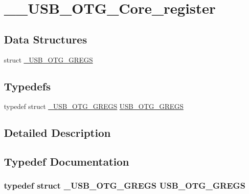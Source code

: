\hypertarget{group_______u_s_b___o_t_g___core__register}{\section{\-\_\-\-\_\-\-U\-S\-B\-\_\-\-O\-T\-G\-\_\-\-Core\-\_\-register}
\label{group_______u_s_b___o_t_g___core__register}
}
\subsection*{Data Structures}
\begin{DoxyCompactItemize}
\item 
struct \hyperlink{struct___u_s_b___o_t_g___g_r_e_g_s}{\-\_\-\-U\-S\-B\-\_\-\-O\-T\-G\-\_\-\-G\-R\-E\-G\-S}
\end{DoxyCompactItemize}
\subsection*{Typedefs}
\begin{DoxyCompactItemize}
\item 
typedef struct \hyperlink{struct___u_s_b___o_t_g___g_r_e_g_s}{\-\_\-\-U\-S\-B\-\_\-\-O\-T\-G\-\_\-\-G\-R\-E\-G\-S} \hyperlink{group_______u_s_b___o_t_g___core__register_ga726f86373d99c6ac3a1d9eff0f08d96e}{U\-S\-B\-\_\-\-O\-T\-G\-\_\-\-G\-R\-E\-G\-S}
\end{DoxyCompactItemize}


\subsection{Detailed Description}


\subsection{Typedef Documentation}
\hypertarget{group_______u_s_b___o_t_g___core__register_ga726f86373d99c6ac3a1d9eff0f08d96e}{
\subsubsection[{U\-S\-B\-\_\-\-O\-T\-G\-\_\-\-G\-R\-E\-G\-S}]{\setlength{\rightskip}{0pt plus 5cm}typedef struct {\bf \-\_\-\-U\-S\-B\-\_\-\-O\-T\-G\-\_\-\-G\-R\-E\-G\-S}
 {\bf U\-S\-B\-\_\-\-O\-T\-G\-\_\-\-G\-R\-E\-G\-S}}}\label{group_______u_s_b___o_t_g___core__register_ga726f86373d99c6ac3a1d9eff0f08d96e}
